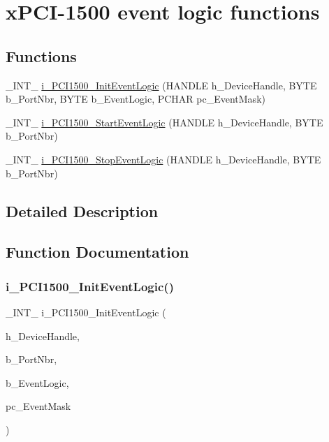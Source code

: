 \hypertarget{group___event}{}\section{x\+P\+C\+I-\/1500 event logic functions}
\label{group___event}
\subsection*{Functions}
\begin{DoxyCompactItemize}
\item 
\+\_\+\+I\+N\+T\+\_\+ \mbox{\hyperlink{group___event_ga08dacc054871151f68f5252cefeefbf4}{i\+\_\+\+P\+C\+I1500\+\_\+\+Init\+Event\+Logic}} (H\+A\+N\+D\+LE h\+\_\+\+Device\+Handle, B\+Y\+TE b\+\_\+\+Port\+Nbr, B\+Y\+TE b\+\_\+\+Event\+Logic, P\+C\+H\+AR pc\+\_\+\+Event\+Mask)
\item 
\+\_\+\+I\+N\+T\+\_\+ \mbox{\hyperlink{group___event_ga81a9a5f89af5f2420834481c4c8ac858}{i\+\_\+\+P\+C\+I1500\+\_\+\+Start\+Event\+Logic}} (H\+A\+N\+D\+LE h\+\_\+\+Device\+Handle, B\+Y\+TE b\+\_\+\+Port\+Nbr)
\item 
\+\_\+\+I\+N\+T\+\_\+ \mbox{\hyperlink{group___event_ga8d86e6676fb80419df573034c392a20d}{i\+\_\+\+P\+C\+I1500\+\_\+\+Stop\+Event\+Logic}} (H\+A\+N\+D\+LE h\+\_\+\+Device\+Handle, B\+Y\+TE b\+\_\+\+Port\+Nbr)
\end{DoxyCompactItemize}


\subsection{Detailed Description}


\subsection{Function Documentation}
\mbox{\label{group___event_ga08dacc054871151f68f5252cefeefbf4}} 
\subsubsection{\texorpdfstring{i\_PCI1500\_InitEventLogic()}{i\_PCI1500\_InitEventLogic()}}
{\footnotesize\ttfamily \+\_\+\+I\+N\+T\+\_\+ i\+\_\+\+P\+C\+I1500\+\_\+\+Init\+Event\+Logic (\begin{DoxyParamCaption}\item[{H\+A\+N\+D\+LE}]{h\+\_\+\+Device\+Handle,  }\item[{B\+Y\+TE}]{b\+\_\+\+Port\+Nbr,  }\item[{B\+Y\+TE}]{b\+\_\+\+Event\+Logic,  }\item[{P\+C\+H\+AR}]{pc\+\_\+\+Event\+Mask }\end{DoxyParamCaption})}

